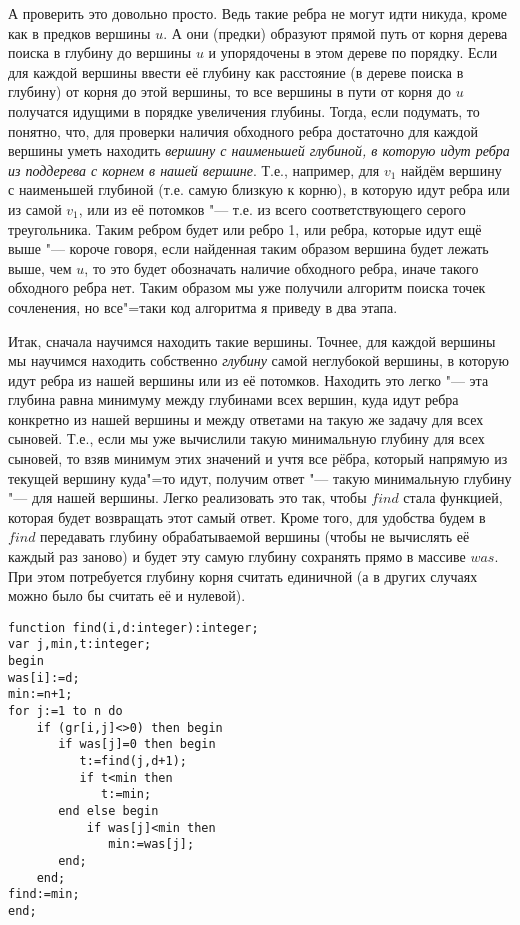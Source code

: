 А проверить это довольно просто. Ведь такие ребра не могут идти никуда, кроме как в предков вершины
$u$. А они (предки) образуют прямой путь от корня дерева поиска в глубину до вершины $u$ и упорядочены
в этом дереве по порядку. Если для каждой вершины ввести её глубину как расстояние (в дереве поиска в глубину)
от корня до этой вершины, то все вершины в пути от корня до $u$ получатся идущими в порядке увеличения глубины.
Тогда, если подумать, то понятно, что, для проверки наличия обходного ребра достаточно для
каждой вершины уметь находить \textit{вершину с наименьшей глубиной, в которую идут ребра из поддерева с корнем
в нашей вершине}. Т.е., например, для $v_1$ найдём вершину с наименьшей глубиной (т.е. самую близкую к корню),
в которую идут ребра или из самой $v_1$, или из её потомков "--- т.е. из всего соответствующего серого
треугольника. Таким ребром будет или ребро 1, или ребра, которые идут ещё выше "--- короче говоря, если
найденная таким образом вершина будет лежать выше, чем $u$, то это будет обозначать наличие обходного ребра,
иначе такого обходного ребра нет. Таким образом мы уже получили алгоритм поиска точек сочленения,
но все"=таки код алгоритма я приведу в два этапа.

Итак, сначала научимся находить такие вершины. Точнее, для каждой вершины мы научимся находить собственно
\textit{глубину} самой неглубокой вершины, в которую идут ребра из нашей вершины или из её потомков. Находить
это легко "--- эта глубина равна минимуму между глубинами всех вершин, куда идут ребра конкретно из нашей вершины
и между ответами на такую же задачу для всех сыновей. Т.е., если мы уже вычислили такую минимальную глубину
для всех сыновей, то взяв минимум этих значений и учтя все рёбра, который напрямую из текущей вершину куда"=то
идут, получим ответ "--- такую минимальную глубину "--- для нашей вершины. Легко реализовать это так, чтобы
$find$ стала функцией, которая будет возвращать этот самый ответ. Кроме того, для удобства будем в $find$ передавать
глубину обрабатываемой вершины (чтобы не вычислять её каждый раз заново) и будет эту самую глубину сохранять 
прямо в массиве $was$. При этом потребуется глубину корня считать единичной (а в других случаях можно было бы считать её
и нулевой).
\begin{codesampleo}\begin{verbatim}
function find(i,d:integer):integer;
var j,min,t:integer;
begin
was[i]:=d;
min:=n+1;
for j:=1 to n do
    if (gr[i,j]<>0) then begin
       if was[j]=0 then begin
          t:=find(j,d+1);
          if t<min then
             t:=min;
       end else begin
           if was[j]<min then
              min:=was[j];
       end;
    end;
find:=min;
end;
\end{verbatim}\end{codesampleo}

